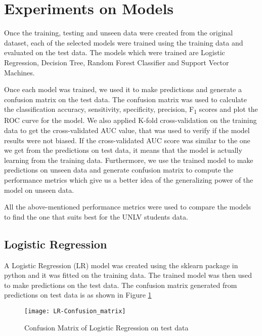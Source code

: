 \documentclass[11pt,openright]{report}
\begin{document}
\section {Experiments on Models}
Once the training, testing and unseen data were created from the original dataset, each of the selected models were trained using the training data and evaluated on the test data. The models which were trained are Logistic Regression, Decision Tree, Random Forest Classifier and Support Vector Machines. 

Once each model was trained, we used it to make predictions and generate a confusion matrix on the test data. The confusion matrix was used to calculate the classification accuracy, sensitivity, specificity, precision, F\textsubscript{1} scores and plot the ROC curve for the model. We also applied K-fold cross-validation on the training data to get the cross-validated AUC value, that was used to verify if the model results were not biased. If the cross-validated AUC score was similar to the one we get from the predictions on test data, it means that the model is actually learning from the training data. Furthermore, we use the trained model to make predictions on unseen data and generate confusion matrix to compute the performance metrics which give us a better idea of the generalizing power of the model on unseen data.  

All the above-mentioned performance metrics were used to compare the models to find the one that suits best for the UNLV students data. 

\subsection {Logistic Regression}
A Logistic Regression (LR) model was created using the sklearn package in python and it was fitted on the training data. The trained model was then used to make predictions on the test data. The confusion matrix generated from predictions on test data is as shown in Figure \ref{fig:lr_confusion_matrix}

  \begin{figure}[!htb]
	\centering
	\texttt{[image: LR-Confusion\_matrix]}
	\caption{Confusion Matrix of Logistic Regression on test data}
	\label{fig:lr_confusion_matrix}
\end{figure} 
\end{document}
